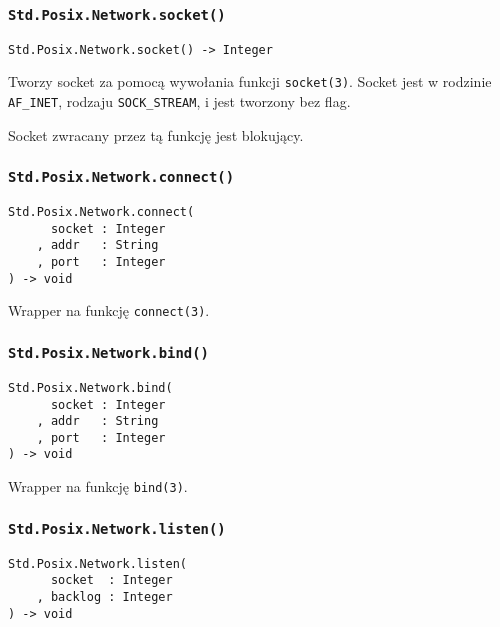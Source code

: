 \subsubsection{\texttt{Std.Posix.Network.socket()}}

\begin{small}
\begin{lstlisting}
Std.Posix.Network.socket() -> Integer
\end{lstlisting}
\end{small}

Tworzy socket za pomocą wywołania funkcji \texttt{socket(3)}.
Socket jest w rodzinie \texttt{AF\_INET}, rodzaju \texttt{SOCK\_STREAM}, i jest tworzony bez flag.

Socket zwracany przez tą funkcję jest blokujący.

\subsubsection{\texttt{Std.Posix.Network.connect()}}

\begin{small}
\begin{lstlisting}
Std.Posix.Network.connect(
      socket : Integer
    , addr   : String
    , port   : Integer
) -> void
\end{lstlisting}
\end{small}

Wrapper na funkcję \texttt{connect(3)}.

\subsubsection{\texttt{Std.Posix.Network.bind()}}

\begin{small}
\begin{lstlisting}
Std.Posix.Network.bind(
      socket : Integer
    , addr   : String
    , port   : Integer
) -> void
\end{lstlisting}
\end{small}

Wrapper na funkcję \texttt{bind(3)}.

\subsubsection{\texttt{Std.Posix.Network.listen()}}

\begin{small}
\begin{lstlisting}
Std.Posix.Network.listen(
      socket  : Integer
    , backlog : Integer
) -> void
\end{lstlisting}
\end{small}

